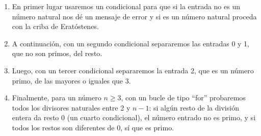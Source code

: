 \documentclass[]{book}
\newenvironment{Shaded}{\begin{snugshade}}{\end{snugshade}}
\newcommand{\CommentTok}[1]{\textcolor[rgb]{0.56,0.35,0.01}{\textit{#1}}}
\newcommand{\ControlFlowTok}[1]{\textcolor[rgb]{0.13,0.29,0.53}{\textbf{#1}}}
\newcommand{\DecValTok}[1]{\textcolor[rgb]{0.00,0.00,0.81}{#1}}
\newcommand{\KeywordTok}[1]{\textcolor[rgb]{0.13,0.29,0.53}{\textbf{#1}}}
\newcommand{\NormalTok}[1]{#1}
\newcommand{\OperatorTok}[1]{\textcolor[rgb]{0.81,0.36,0.00}{\textbf{#1}}}
\newcommand{\OtherTok}[1]{\textcolor[rgb]{0.56,0.35,0.01}{#1}}
\newcommand{\StringTok}[1]{\textcolor[rgb]{0.31,0.60,0.02}{#1}}
\theoremstyle{definition}
\theoremstyle{definition}
\theoremstyle{definition}
\theoremstyle{remark}
\begin{document}
\begin{enumerate}
\def\labelenumi{\arabic{enumi}.}
\item
  En primer lugar usaremos un condicional para que si la entrada no es un número natural nos dé un mensaje de error y si es un número natural proceda con la criba de Eratóstenes.
\item
  A continuación, con un segundo condicional separaremos las entradas 0 y 1, que no son primos, del resto.
\item
  Luego, con un tercer condicional separaremos la entrada 2, que es un número primo, de las mayores o iguales que 3.
\item
  Finalmente, para un número \(n\geqslant 3\), con un bucle de tipo ``for'' probaremos todos los divisores naturales entre 2 y \(n-1\): si algún resto de la división entera da resto 0 (un cuarto condicional), el número entrado no es primo, y si todos los restos son diferentes de 0, sí que es primo.
\end{enumerate}

\begin{Shaded}
\end{Shaded}
\end{document}

